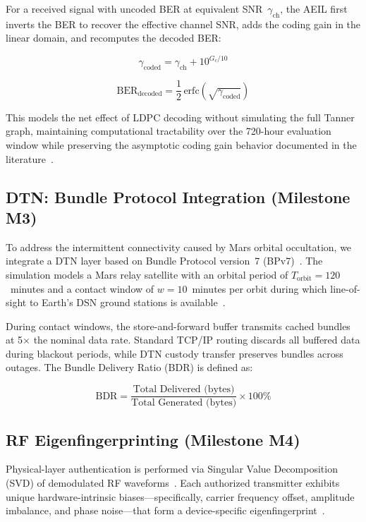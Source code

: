 \documentclass[journal]{IEEEtran}
\begin{document}
For a received signal with uncoded BER at equivalent SNR~$\gamma_{\text{ch}}$, the AEIL first inverts the BER to recover the effective channel SNR, adds the coding gain in the linear domain, and recomputes the decoded BER:

\begin{equation}
\gamma_{\text{coded}} = \gamma_{\text{ch}} + 10^{G_c/10}
\label{eq:aeil_gain}
\end{equation}

\begin{equation}
\text{BER}_{\text{decoded}} = \frac{1}{2}\,\text{erfc}\!\left(\sqrt{\gamma_{\text{coded}}}\right)
\label{eq:aeil_ber}
\end{equation}

This models the net effect of LDPC decoding without simulating the full Tanner graph, maintaining computational tractability over the 720-hour evaluation window while preserving the asymptotic coding gain behavior documented in the literature~\cite{richardson2008modern}.

\subsection{DTN: Bundle Protocol Integration (Milestone M3)}
To address the intermittent connectivity caused by Mars orbital occultation, we integrate a DTN layer based on Bundle Protocol version~7 (BPv7)~\cite{rfc9171, fall2003dtn}.
The simulation models a Mars relay satellite with an orbital period of $T_{\text{orbit}} = 120$~minutes and a contact window of $w = 10$~minutes per orbit during which line-of-sight to Earth's DSN ground stations is available~\cite{caini2011dtn}.

During contact windows, the store-and-forward buffer transmits cached bundles at 5$\times$ the nominal data rate.
Standard TCP/IP routing discards all buffered data during blackout periods, while DTN custody transfer preserves bundles across outages.
The Bundle Delivery Ratio (BDR) is defined as:

\begin{equation}
\text{BDR} = \frac{\text{Total Delivered (bytes)}}{\text{Total Generated (bytes)}} \times 100\%
\label{eq:bdr}
\end{equation}

\subsection{RF Eigenfingerprinting (Milestone M4)}
Physical-layer authentication is performed via Singular Value Decomposition (SVD) of demodulated RF waveforms~\cite{boussoufa2022rf, danev2012transient}.
Each authorized transmitter exhibits unique hardware-intrinsic biases---specifically, carrier frequency offset, amplitude imbalance, and phase noise---that form a device-specific eigenfingerprint~\cite{brik2008wireless}.
\end{document}
